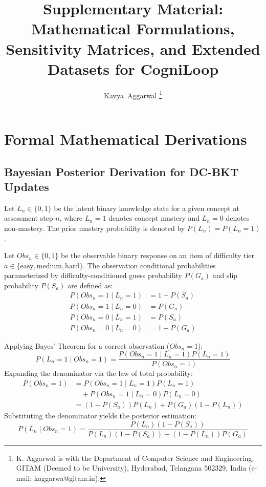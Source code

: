 \documentclass[10pt,journal,compsoc]{IEEEtran}
\begin{document}
\title{Supplementary Material: Mathematical Formulations, Sensitivity Matrices, and Extended Datasets for CogniLoop}

\author{Kavya~Aggarwal%
\thanks{K. Aggarwal is with the Department of Computer Science and Engineering, GITAM (Deemed to be University), Hyderabad, Telangana 502329, India (e-mail: kaggarwa@gitam.in).}}

\maketitle

\appendices

\section{Formal Mathematical Derivations}

\subsection{Bayesian Posterior Derivation for DC-BKT Updates}
Let $L_n \in \{0, 1\}$ be the latent binary knowledge state for a given concept at assessment step $n$, where $L_n = 1$ denotes concept mastery and $L_n = 0$ denotes non-mastery. The prior mastery probability is denoted by $P(L_n) = P(L_n = 1)$.

Let $Obs_n \in \{0, 1\}$ be the observable binary response on an item of difficulty tier $a \in \{\text{easy}, \text{medium}, \text{hard}\}$. The observation conditional probabilities parameterized by difficulty-conditioned guess probability $P(G_a)$ and slip probability $P(S_a)$ are defined as:
\begin{align}
P(Obs_n = 1 \mid L_n = 1) &= 1 - P(S_a) \\
P(Obs_n = 1 \mid L_n = 0) &= P(G_a) \\
P(Obs_n = 0 \mid L_n = 1) &= P(S_a) \\
P(Obs_n = 0 \mid L_n = 0) &= 1 - P(G_a)
\end{align}

Applying Bayes' Theorem for a correct observation ($Obs_n = 1$):
\begin{equation}
P(L_n = 1 \mid Obs_n = 1) = \frac{P(Obs_n = 1 \mid L_n = 1) P(L_n = 1)}{P(Obs_n = 1)}
\end{equation}
Expanding the denominator via the law of total probability:
\begin{align}
P(Obs_n = 1) &= P(Obs_n = 1 \mid L_n = 1)P(L_n = 1) \nonumber \\
&\quad + P(Obs_n = 1 \mid L_n = 0)P(L_n = 0) \nonumber \\
&= (1 - P(S_a))P(L_n) + P(G_a)(1 - P(L_n))
\end{align}
Substituting the denominator yields the posterior estimation:
\begin{equation}
P(L_n \mid Obs_n = 1) = \frac{P(L_n)(1 - P(S_a))}{P(L_n)(1 - P(S_a)) + (1 - P(L_n))P(G_a)}
\end{equation}
\end{document}
